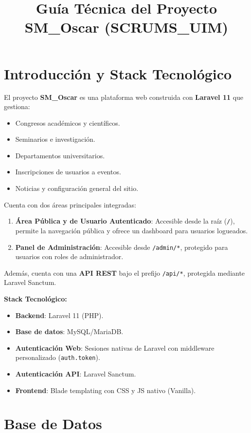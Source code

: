 \documentclass{article}
\title{Guía Técnica del Proyecto SM\_Oscar (SCRUMS\_UIM)}
\author{}
\date{}
\begin{document}
\maketitle

\section{Introducción y Stack Tecnológico}

El proyecto \textbf{SM\_Oscar} es una plataforma web construida con \textbf{Laravel 11} que gestiona:
\begin{itemize}
    \item Congresos académicos y científicos.
    \item Seminarios e investigación.
    \item Departamentos universitarios.
    \item Inscripciones de usuarios a eventos.
    \item Noticias y configuración general del sitio.
\end{itemize}

Cuenta con dos áreas principales integradas:
\begin{enumerate}
    \item \textbf{Área Pública y de Usuario Autenticado}: Accesible desde la raíz (\texttt{/}), permite la navegación pública y ofrece un dashboard para usuarios logueados.
    \item \textbf{Panel de Administración}: Accesible desde \texttt{/admin/*}, protegido para usuarios con roles de administrador.
\end{enumerate}

Además, cuenta con una \textbf{API REST} bajo el prefijo \texttt{/api/*}, protegida mediante Laravel Sanctum.

\textbf{Stack Tecnológico:}
\begin{itemize}
    \item \textbf{Backend}: Laravel 11 (PHP).
    \item \textbf{Base de datos}: MySQL/MariaDB.
    \item \textbf{Autenticación Web}: Sesiones nativas de Laravel con middleware personalizado (\texttt{auth.token}).
    \item \textbf{Autenticación API}: Laravel Sanctum.
    \item \textbf{Frontend}: Blade templating con CSS y JS nativo (Vanilla).
\end{itemize}

\section{Base de Datos}
\end{document}
